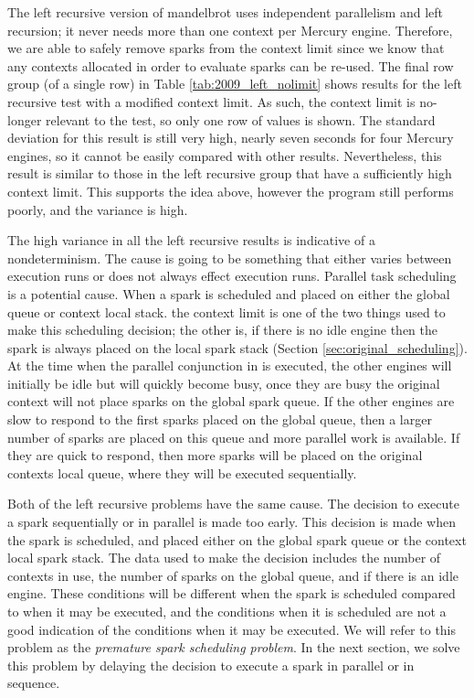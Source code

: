 The left recursive version of mandelbrot uses independent
parallelism and left recursion;
it never needs more than one context per Mercury engine.
Therefore, we are able to safely remove sparks from the context limit
since we know that any contexts allocated in order to evaluate sparks
can be re-used.
The final row group (of a single row) in Table
\ref{tab:2009_left_nolimit} shows results for the left recursive test
with a modified context limit.
As such, the context limit is no-longer relevant to the test,
so only one row of values is shown.
The standard deviation for this result is still very high,
nearly seven seconds for four Mercury engines,
so it cannot be easily compared with other results.
Nevertheless, this result is similar to those in the left recursive
group that have a sufficiently high context limit.
This supports the idea above, however the program still performs poorly,
and the variance is high.

The high variance in all the left recursive results is
indicative of a nondeterminism.
The cause is going to be something that either varies between execution
runs or does not always effect execution runs.
Parallel task scheduling is a potential cause.
When a spark is scheduled and placed on either the global queue or
context local stack.
the context limit is one of the two things used to make this scheduling
decision;
the other is, if there is no idle engine then the spark is always
placed on the local spark stack (Section \ref{sec:original_scheduling}).
At the time when the parallel conjunction in  is executed,
the other engines will initially be idle but will quickly become busy,
once they are busy the original context will not place sparks on the
global spark queue.
If the other engines are slow to respond to the first sparks placed
on the global queue,
then a larger number of sparks are placed on this queue and more
parallel work is available.
If they are quick to respond,
then more sparks will be placed on the original contexts local queue,
where they will be executed sequentially.

Both of the left recursive problems have the same cause.
The decision to execute a spark sequentially or in parallel is
made too early.
This decision is made when the spark is scheduled,
and placed either on the global spark queue or the context local spark
stack.
The data used to make the decision includes the number of contexts in
use,
the number of sparks on the global queue,
and if there is an idle engine.
These conditions will be different when the spark is scheduled compared
to when it may be executed,
and the conditions when it is scheduled are not a good indication of
the conditions when it may be executed.
We will refer to this problem as the \emph{premature spark scheduling problem}.
In the next section,
we solve this problem by delaying the decision to execute a spark in
parallel or in sequence.

